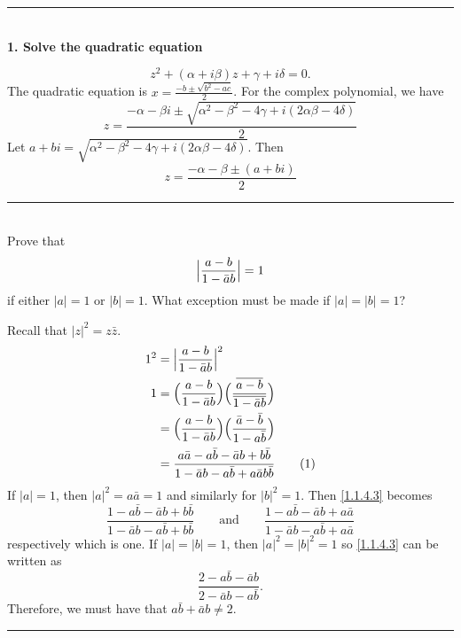 \documentclass[notitlepage]{report}
\newcommand{\eqnumtag}{%
	\refstepcounter{equation}%
	\tag{\theequation}%
}
\begin{document}
	\noindent\rule{\textwidth}{1pt}\\[-0.1cm]
		
	\textbf{1. Solve the quadratic equation}
	
	\[
	z^2 + (\alpha + i\beta)z + \gamma + i\delta = 0.
	\]
	The quadratic equation is \(x = \frac{-b\pm\sqrt{b^2 - ac}}{2}\).
	For the complex polynomial, we have
	\[
	z = \frac{-\alpha - \beta i\pm
		\sqrt{\alpha^2 - \beta^2 - 4\gamma + i(2\alpha\beta - 4\delta)}}{2}
	\]
	Let
	\(a + bi = \sqrt{\alpha^2 - \beta^2 - 4\gamma + i(2\alpha\beta - 4\delta)}\).
	Then
	\[
	z = \frac{-\alpha - \beta\pm (a + bi)}{2}
	\]
	
	
	
	\noindent\rule{\textwidth}{1pt}\\[-0.1cm]
	
	  Prove that
	  \[
	  \Bigl\lvert\frac{a - b}{1 - \bar{a}b}\Bigr\rvert = 1
	  \]
	  if either \(\lvert a\rvert = 1\) or \(\lvert b\rvert = 1\).
	  What exception must be made if \(\lvert a\rvert = \lvert b\rvert = 1\)?
	  \par\smallskip
	  Recall that \(\lvert z\rvert^2 = z\bar{z}\).
	  \begin{align*}
	  1^2 & = \Bigl\lvert\frac{a - b}{1 - \bar{a}b}\Bigr\rvert^2\\
	  1 & = \Bigl(\frac{a - b}{1 - \bar{a}b}\Bigr)
	  \Bigl(\frac{\overline{a - b}}{\overline{1 - \bar{a}b}}\Bigr)\\
	  & = \Bigl(\frac{a - b}{1 - \bar{a}b}\Bigr)
	  \Bigl(\frac{\bar{a} - \bar{b}}{1 - a\bar{b}}\Bigr)\\
	  & = \frac{a\bar{a} - a\bar{b} - \bar{a}b + b\bar{b}}
	  {1 - \bar{a}b - a\bar{b} + a\bar{a}b\bar{b}}\eqnumtag\label{1.1.4.3}
	  \end{align*}
	  If \(\lvert a\rvert = 1\), then \(\lvert a\rvert^2 = a\bar{a} = 1\) and
	  similarly for \(\lvert b\rvert^2 = 1\).
	  Then \eqref{1.1.4.3} becomes
	  \[
	  \frac{1 - a\bar{b} - \bar{a}b + b\bar{b}}{1 - \bar{a}b - a\bar{b} + b\bar{b}}
	  \qquad\text{and}\qquad
	  \frac{1 - a\bar{b} - \bar{a}b + a\bar{a}}{1 - \bar{a}b - a\bar{b} + a\bar{a}}
	  \]
	  respectively which is one.
	  If \(\lvert a\rvert = \lvert b\rvert = 1\), then
	  \(\lvert a\rvert^2 = \vert b\rvert^2 = 1\) so \eqref{1.1.4.3} can be written as
	  \[
	  \frac{2 - a\bar{b} - \bar{a}b}{2 - \bar{a}b - a\bar{b}}.
	  \]
	  Therefore, we must have that \(a\bar{b} + \bar{a}b\neq 2\).
	  
	  \noindent\rule{\textwidth}{1pt}\\[-0.1cm]
	  
\end{document}

